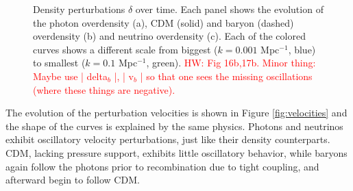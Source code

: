 \documentclass{aa}
\newcommand{\hw}[1]{\textcolor{red}{HW: #1}}
\begin{document}
\begin{figure}[ht]
  \centering
  \quad
  \quad
\caption{Density perturbations $\delta$ over time. Each panel shows the evolution of the photon overdensity (a), CDM (solid) and baryon (dashed) overdensity (b) and neutrino overdensity (c). Each of the colored curves shows a different scale from biggest ($k = 0.001$ Mpc$^{-1}$, blue) to smallest ($k=0.1$ Mpc$^{-1}$, green). \hw{Fig 16b,17b. Minor thing: Maybe use | delta$_b$ |, | v$_b$ | so that one sees the missing oscillations (where these things are negative).}}
\label{fig:densities}
\end{figure}

The evolution of the perturbation velocities is shown in Figure \ref{fig:velocities} and the shape of the curves is explained by the same physics. Photons and neutrinos exhibit oscillatory velocity perturbations, just like their density counterparts. CDM, lacking pressure support, exhibits little oscillatory behavior, while baryons again follow the photons prior to recombination due to tight coupling, and afterward begin to follow CDM.
\end{document}
